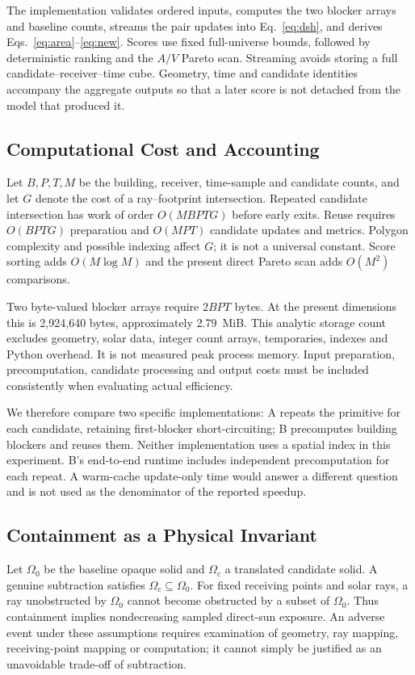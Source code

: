 \documentclass{llncs}
\begin{document}
The implementation validates ordered inputs, computes the two blocker arrays and baseline counts, streams the pair updates into Eq.~\ref{eq:dsh}, and derives Eqs.~\ref{eq:area}--\ref{eq:new}. Scores use fixed full-universe bounds, followed by deterministic ranking and the $A/V$ Pareto scan. Streaming avoids storing a full candidate--receiver--time cube. Geometry, time and candidate identities accompany the aggregate outputs so that a later score is not detached from the model that produced it.

\subsection{Computational Cost and Accounting}
Let $B,P,T,M$ be the building, receiver, time-sample and candidate counts, and let $G$ denote the cost of a ray--footprint intersection. Repeated candidate intersection has work of order $O(MBPTG)$ before early exits. Reuse requires $O(BPTG)$ preparation and $O(MPT)$ candidate updates and metrics. Polygon complexity and possible indexing affect $G$; it is not a universal constant. Score sorting adds $O(M\log M)$ and the present direct Pareto scan adds $O(M^2)$ comparisons.

Two byte-valued blocker arrays require $2BPT$ bytes. At the present dimensions this is 2,924,640 bytes, approximately 2.79~MiB. This analytic storage count excludes geometry, solar data, integer count arrays, temporaries, indexes and Python overhead. It is not measured peak process memory. Input preparation, precomputation, candidate processing and output costs must be included consistently when evaluating actual efficiency.

We therefore compare two specific implementations: A repeats the primitive for each candidate, retaining first-blocker short-circuiting; B precomputes building blockers and reuses them. Neither implementation uses a spatial index in this experiment. B's end-to-end runtime includes independent precomputation for each repeat. A warm-cache update-only time would answer a different question and is not used as the denominator of the reported speedup.

\subsection{Containment as a Physical Invariant}
Let $\Omega_0$ be the baseline opaque solid and $\Omega_c$ a translated candidate solid. A genuine subtraction satisfies $\Omega_c\subseteq\Omega_0$. For fixed receiving points and solar rays, a ray unobstructed by $\Omega_0$ cannot become obstructed by a subset of $\Omega_0$. Thus containment implies nondecreasing sampled direct-sun exposure. An adverse event under these assumptions requires examination of geometry, ray mapping, receiving-point mapping or computation; it cannot simply be justified as an unavoidable trade-off of subtraction.
\end{document}
